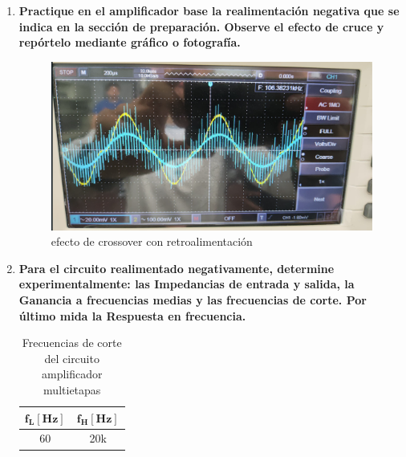 \begin{enumerate}

  \item \textbf{Practique en el amplificador base la realimentación
          negativa que se indica en la sección de preparación.
          Observe el efecto de cruce y repórtelo mediante gráfico o fotografía.}

        \begin{figure}[H]
          \centering
          \renewcommand{\figurename}{Imagen}
          \setcounter{figure}{8}
          \includegraphics[width=\textwidth]{Imagenes/ultcrossover.png}
          \caption{efecto de crossover con retroalimentación}
          \label{fig:ultcross}
        \end{figure}

  \item \textbf{Para el circuito realimentado negativamente, determine experimentalmente: las Impedancias de entrada
          y salida, la Ganancia a frecuencias medias y las frecuencias
          de corte. Por último mida la Respuesta en frecuencia.}

        \begin{table}[H]
          \centering
          \begin{tabular}{|c|c|}
            \hline
            $\mathbf{f_L[Hz]}$ & $\mathbf{f_H[Hz]}$ \\ \hline
            60                 & 20k                \\ \hline
          \end{tabular}
          \caption{Frecuencias de corte del circuito amplificador multietapas}
          \label{tab:frecuencias_corte1}
        \end{table}


\end{enumerate}

